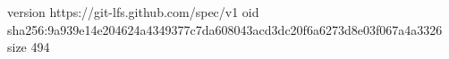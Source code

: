 version https://git-lfs.github.com/spec/v1
oid sha256:9a939e14e204624a4349377c7da608043acd3dc20f6a6273d8e03f067a4a3326
size 494
